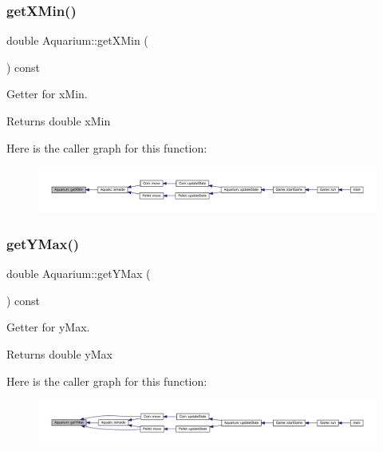 \subsubsection{\texorpdfstring{get\+X\+Min()}{getXMin()}}
{\footnotesize\ttfamily double Aquarium\+::get\+X\+Min (\begin{DoxyParamCaption}{ }\end{DoxyParamCaption}) const}



Getter for x\+Min. 

\begin{DoxyReturn}{Returns}
double x\+Min 
\end{DoxyReturn}
Here is the caller graph for this function\+:\nopagebreak
\begin{figure}[H]
\begin{center}
\leavevmode
\includegraphics[width=350pt]{class_aquarium_a3e9e4b1bc86a90a8654bcc76e20e25f1_icgraph}
\end{center}
\end{figure}
\mbox{\label{class_aquarium_a13893ca5240c99792040a7a64fd80bf5}} 
\subsubsection{\texorpdfstring{get\+Y\+Max()}{getYMax()}}
{\footnotesize\ttfamily double Aquarium\+::get\+Y\+Max (\begin{DoxyParamCaption}{ }\end{DoxyParamCaption}) const}



Getter for y\+Max. 

\begin{DoxyReturn}{Returns}
double y\+Max 
\end{DoxyReturn}
Here is the caller graph for this function\+:\nopagebreak
\begin{figure}[H]
\begin{center}
\leavevmode
\includegraphics[width=350pt]{class_aquarium_a13893ca5240c99792040a7a64fd80bf5_icgraph}
\end{center}
\end{figure}
\mbox{\label{class_aquarium_ad5ef328047a3a0815b32764f7114fbea}} 
